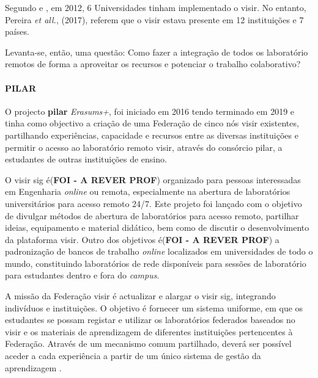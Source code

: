 Segundo \cite{tawfikexperiences} e \cite{tawfikvisir}, em 2012, 6 Universidades tinham implementado o \acrshort{visir}. No entanto, Pereira \textit{et all.}, (2017), referem que o \acrshort{visir} estava presente em 12 instituições e 7 países\cite{pereira}.

\vspace{0.5cm}
Levanta-se, então, uma questão: Como fazer a integração de todos os \acrshort{laboratório remoto}s de forma a aproveitar os recursos e potenciar o trabalho colaborativo?
\vspace{0.5cm}

\paragraph{PILAR}
O projecto \textbf{\acrfull{pilar}} \textit{Erasums+}, foi iniciado em 2016 tendo terminado em 2019 e tinha como objectivo a criação de uma Federação de cinco nós \acrshort{visir} existentes, partilhando experiências, capacidade e recursos entre as diversas instituições e permitir o acesso ao \acrshort{laboratório remoto} \acrshort{visir}, através do consórcio \acrshort{pilar}, a estudantes de outras instituições de ensino\cite{garcia-loro}.

O \acrshort{visir} \acrfull{sig} é(\textbf{FOI - A REVER PROF}) organizado para pessoas interessadas em Engenharia \textit{online} ou remota, especialmente na abertura de laboratórios universitários para acesso remoto 24/7. Este projeto foi lançado com o objetivo de divulgar métodos de abertura de laboratórios para acesso remoto,  partilhar ideias, equipamento e material didático, bem como de discutir o desenvolvimento da plataforma \acrshort{visir}. Outro dos objetivos é(\textbf{FOI - A REVER PROF}) a padronização de bancos de trabalho \textit{online} localizados em universidades de todo o mundo, constituindo laboratórios de rede disponíveis para sessões de laboratório para estudantes dentro e fora do \textit{campus}\cite{visirsig}.

A missão da Federação \acrshort{visir} é actualizar e alargar o \acrshort{visir} \acrshort{sig}, integrando indivíduos e instituições. O objetivo é fornecer um sistema uniforme, em que os estudantes se possam registar e utilizar os laboratórios federados baseados no \acrshort{visir} e os materiais de aprendizagem de diferentes instituições pertencentes à Federação. Através de um mecanismo comum partilhado, deverá ser possível aceder a cada experiência a partir de um único sistema de gestão da aprendizagem \cite{visirfederation}.

